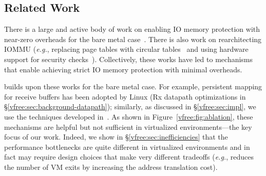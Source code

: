 \subsection{Related Work}
\label{vfree:sec:related}

There is a large and active body of work on enabling IO memory protection with near-zero overheads for the bare metal case~\cite{ben2007price, Malka2015rIOMMU, malka2015efficient, peleg2015utilizing, Markuze2016true, markuze2018damn, RajapakshaIOMMU, Rubin2024FastSafe}. There is also work on rearchitecting IOMMU (\textit{e.g.}, replacing page tables with circular tables~\cite{Malka2015rIOMMU}
    and using hardware support for security checks~\cite{RajapakshaIOMMU}). Collectively, these works have led to mechanisms that enable achieving strict IO memory protection with minimal overheads. 

{\vfreename} builds upon these works for the bare metal case. For example, persistent
mapping for receive buffers has been adopted by Linux (Rx datapath optimizations in \S\ref{vfree:sec:background-datapath}); similarly, as discussed in \S\ref{vfree:sec:impl}, we use the techniques developed in~\cite{Rubin2024FastSafe}. As shown in Figure~\ref{vfree:fig:ablation}, these mechanisms are helpful but not sufficient in virtualized environments---the key focus of our work. Indeed, we show in \S\ref{vfree:sec:inefficiencies} that the performance bottlenecks are quite different in virtualized environments and in fact may require design choices that make very different tradeoffs (\textit{e.g.}, {\vfreename} reduces the number of VM exits by increasing the address translation cost).
    
